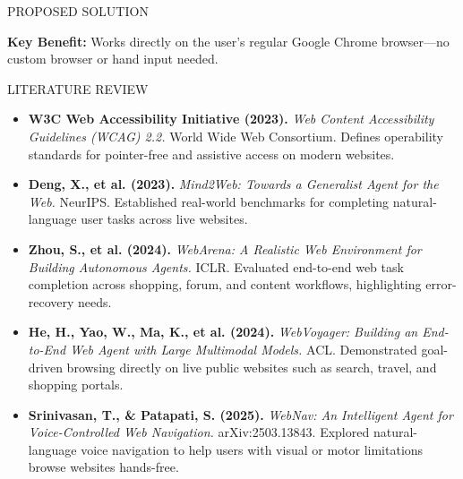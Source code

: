 \documentclass[aspectratio=169,9pt]{beamer}
\begin{document}
\begin{frame}{PROPOSED SOLUTION}
\begin{center}
\end{center}

\vspace{0.22cm}
\begin{center}
  {\footnotesize\color{refSlate}\textbf{Key Benefit:} Works directly on the user's regular Google Chrome browser---no custom browser or hand input needed.}
\end{center}
\end{frame}

\begin{frame}{LITERATURE REVIEW}
\begin{itemize}\setlength{\itemsep}{8pt}\small
  \item \textbf{W3C Web Accessibility Initiative (2023).} \textit{Web Content Accessibility Guidelines (WCAG) 2.2.} World Wide Web Consortium. Defines operability standards for pointer-free and assistive access on modern websites.
  \item \textbf{Deng, X., et al. (2023).} \textit{Mind2Web: Towards a Generalist Agent for the Web.} NeurIPS. Established real-world benchmarks for completing natural-language user tasks across live websites.
  \item \textbf{Zhou, S., et al. (2024).} \textit{WebArena: A Realistic Web Environment for Building Autonomous Agents.} ICLR. Evaluated end-to-end web task completion across shopping, forum, and content workflows, highlighting error-recovery needs.
  \item \textbf{He, H., Yao, W., Ma, K., et al. (2024).} \textit{WebVoyager: Building an End-to-End Web Agent with Large Multimodal Models.} ACL. Demonstrated goal-driven browsing directly on live public websites such as search, travel, and shopping portals.
  \item \textbf{Srinivasan, T., \& Patapati, S. (2025).} \textit{WebNav: An Intelligent Agent for Voice-Controlled Web Navigation.} arXiv:2503.13843. Explored natural-language voice navigation to help users with visual or motor limitations browse websites hands-free.
\end{itemize}
\end{frame}
\end{document}
